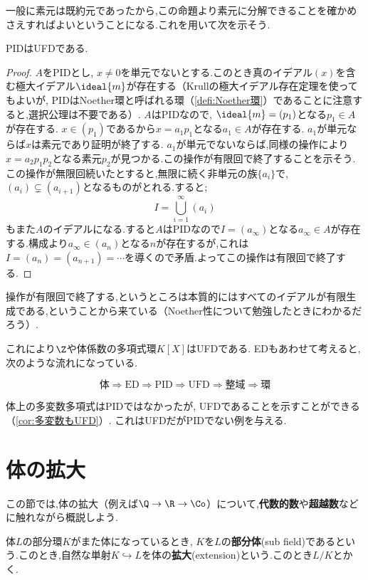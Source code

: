 一般に素元は既約元であったから,この命題より素元に分解できることを確かめさえすればよいということになる.これを用いて次を示そう.
\begin{thm}
	PIDはUFDである.
\end{thm}

\begin{proof}
	$A$をPIDとし, $x\neq0$を単元でないとする.このとき真のイデアル$(x)$を含む極大イデアル$\ideal{m}$が存在する（Krullの極大イデアル存在定理を使ってもよいが, PIDはNoether環と呼ばれる環（\ref{defi:Noether環}）であることに注意すると,選択公理は不要である）. $A$はPIDなので, $\ideal{m}=(p_1)$となる$p_1\in A$が存在する. $x\in(p_1)$であるから$x=a_1p_1$となる$a_1\in A$が存在する. $a_1$が単元ならば$x$は素元であり証明が終了する. $a_1$が単元でないならば,同様の操作により$x=a_2p_1p_2$となる素元$p_2$が見つかる.この操作が有限回で終了することを示そう.この操作が無限回続いたとすると,無限に続く非単元の族$\{a_i\}$で, $(a_i)\subsetneq (a_{i+1})$となるものがとれる.すると;
	\[I=\bigcup_{i=1}^\infty (a_i)\]
	もまた$A$のイデアルになる.すると$A$はPIDなので$I=(a_\infty)$となる$a_\infty\in A$が存在する.構成より$a_\infty\in (a_n)$となる$n$が存在するが,これは$I=(a_n)=(a_{n+1})=\cdots$を導くので矛盾.よってこの操作は有限回で終了する.
\end{proof}

操作が有限回で終了する,というところは本質的にはすべてのイデアルが有限生成である,ということから来ている（Noether性について勉強したときにわかるだろう）.

これにより$\Z$や体係数の多項式環$K[X]$はUFDである. EDもあわせて考えると,次のような流れになっている.

\[\text{体}\Longrightarrow\text{ED}\Longrightarrow\text{PID}\Longrightarrow\text{UFD}\Longrightarrow\text{整域}\Longrightarrow\text{環}\]

体上の多変数多項式はPIDではなかったが, UFDであることを示すことができる（\ref{cor:多変数もUFD}）. これはUFDだがPIDでない例を与える.

\section{体の拡大}

この節では,体の拡大（例えば$\Q\to\R\to\Co$）について,\textbf{代数的数}や\textbf{超越数}などに触れながら概説しよう.

体$L$の部分環$K$がまた体になっているとき, $K$を$L$の\textbf{部分体}(sub field)であるという.このとき,自然な単射$K\hookrightarrow L$を体の\textbf{拡大}(extension)という.このとき$L/K$とかく.

